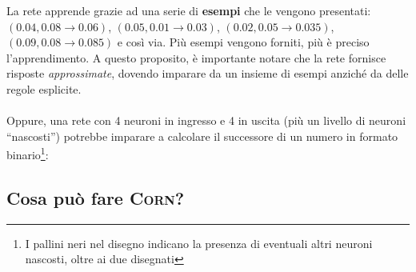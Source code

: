 \documentclass{article}
\begin{document}
La rete apprende grazie ad una serie di \textbf{esempi} che le vengono presentati: $(0.04, 0.08 \rightarrow 0.06)$, $(0.05, 0.01 \rightarrow 0.03)$, $(0.02, 0.05 \rightarrow 0.035)$, $(0.09, 0.08 \rightarrow 0.085)$ e così via. Più esempi vengono forniti, più è preciso l'apprendimento. A questo proposito, è importante notare che la rete fornisce risposte \textit{approssimate}, dovendo imparare da un insieme di esempi anziché da delle regole esplicite.

\paragraph{} Oppure, una rete con 4 neuroni in ingresso e 4 in uscita (più un livello di neuroni “nascosti”) potrebbe imparare a calcolare il successore di un numero in formato binario\footnote{I pallini neri nel disegno indicano la presenza di eventuali altri neuroni nascosti, oltre ai due disegnati}:

\begin{center}
\end{center}

\subsection{Cosa può fare \textsc{Corn}?}
\end{document}
